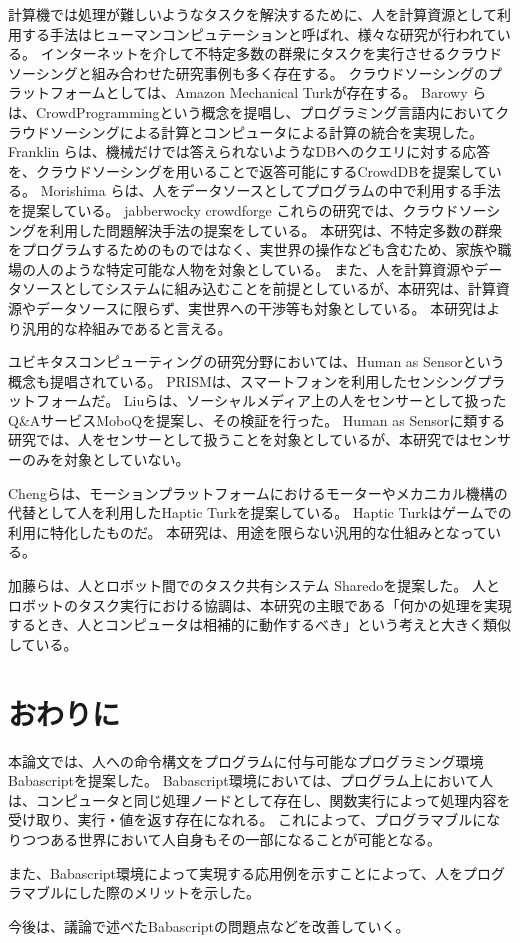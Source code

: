 計算機では処理が難しいようなタスクを解決するために、人を計算資源として利用する手法はヒューマンコンピュテーション\cite{HumanComputation}と呼ばれ、様々な研究が行われている。
インターネットを介して不特定多数の群衆にタスクを実行させるクラウドソーシングと組み合わせた研究事例も多く存在する。
クラウドソーシングのプラットフォームとしては、Amazon Mechanical
Turk\cite{mechanicalturk}が存在する。 Barowy
らは、CrowdProgrammingという概念を提唱し、プログラミング言語内においてクラウドソーシングによる計算とコンピュータによる計算の統合を実現した\cite{automan}。
Franklin
らは、機械だけでは答えられないようなDBへのクエリに対する応答を、クラウドソーシングを用いることで返答可能にするCrowdDBを提案している\cite{crowddb}。
Morishima
らは、人をデータソースとしてプログラムの中で利用する手法を提案している\cite{cylog}。
jabberwocky crowdforge
これらの研究では、クラウドソーシングを利用した問題解決手法の提案をしている。
本研究は、不特定多数の群衆をプログラムするためのものではなく、実世界の操作なども含むため、家族や職場の人のような特定可能な人物を対象としている。
また、人を計算資源やデータソースとしてシステムに組み込むことを前提としているが、本研究は、計算資源やデータソースに限らず、実世界への干渉等も対象としている。
本研究はより汎用的な枠組みであると言える。

ユビキタスコンピューティングの研究分野においては、Human as
Sensorという概念も提唱されている。
PRISMは、スマートフォンを利用したセンシングプラットフォームだ\cite{prism}。
Liuらは、ソーシャルメディア上の人をセンサーとして扱ったQ\&AサービスMoboQを提案し、その検証を行った。
Human as
Sensorに類する研究では、人をセンサーとして扱うことを対象としているが、本研究ではセンサーのみを対象としていない。

Chengらは、モーションプラットフォームにおけるモーターやメカニカル機構の代替として人を利用したHaptic
Turkを提案している\cite{hapticturk}。 Haptic
Turkはゲームでの利用に特化したものだ。
本研究は、用途を限らない汎用的な仕組みとなっている。

加藤らは、人とロボット間でのタスク共有システム
Sharedoを提案した\cite{sharedo}。
人とロボットのタスク実行における協調は、本研究の主眼である「何かの処理を実現するとき、人とコンピュータは相補的に動作するべき」という考えと大きく類似している。

\section{おわりに}\label{ux304aux308fux308aux306b}

本論文では、人への命令構文をプログラムに付与可能なプログラミング環境Babascriptを提案した。
Babascript環境においては、プログラム上において人は、コンピュータと同じ処理ノードとして存在し、関数実行によって処理内容を受け取り、実行・値を返す存在になれる。
これによって、プログラマブルになりつつある世界において人自身もその一部になることが可能となる。

また、Babascript環境によって実現する応用例を示すことによって、人をプログラマブルにした際のメリットを示した。

今後は、議論で述べたBabascriptの問題点などを改善していく。

